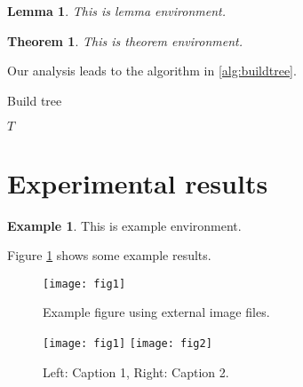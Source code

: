 \documentclass[10pt,reqno,final]{amsart}
\numberwithin{equation}{section}
\numberwithin{figure}{section}
\numberwithin{table}{section}
\theoremstyle{plain}
\newtheorem{theorem}{Theorem}[section]
\newtheorem{lemma}{Lemma}[section]
\theoremstyle{definition}
\newtheorem{example}{Example}
\theoremstyle{remark}
\begin{document}
\lipsum[40]

\begin{lemma}
  This is lemma environment.
\end{lemma}


\begin{theorem}
  This is theorem environment.
\end{theorem}


Our analysis leads to the algorithm in \ref{alg:buildtree}.

\begin{algorithm}
\caption{Build tree}
\label{alg:buildtree}
\begin{algorithmic}
\ENDWHILE
\RETURN $T$
\end{algorithmic}
\end{algorithm}

\lipsum[41]

\section{Experimental results}
\label{sec:experiments}

\lipsum[45-46]

\begin{example}
  This is example environment.
\end{example}

Figure \ref{fig:a} shows some example results.

\begin{figure}[htp!]
  \centering
  \texttt{[image: fig1]}
  \caption{Example figure using external image files.}
  \label{fig:a}
\end{figure}

\lipsum[48]

\begin{figure}[htp!]
  \centering
  \texttt{[image: fig1]}
  \hfill
  \texttt{[image: fig2]}
  \caption{Left: Caption 1, Right: Caption 2.}
  \label{fig:b}
\end{figure}
\end{document}
